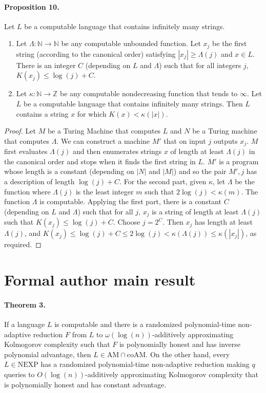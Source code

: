 \documentclass[10pt,a4paper]{article}
\begin{document}
\paragraph{Proposition 10.}
Let $L$ be a computable language that contains infinitely many strings.
\begin{enumerate}
\item Let $\Lambda:\mathbb N\to\mathbb N$ be any computable unbounded function. Let $x_j$ be the first string (according to the canonical order) satisfying $|x_j|\geq\Lambda(j)$ and $x\in L$. There is an integer $C$ (depending on $L$ and $\Lambda$) such that for all integers $j$, $K(x_j)\leq\log(j)+C$.
\item Let $\kappa:\mathbb N\to\mathbb Z$ be any computable nondecreasing function that tends to $\infty$. Let $L$ be a computable language that contains infinitely many strings. Then $L$ contains a string $x$ for which $K(x)<\kappa(|x|)$.
\end{enumerate}
\begin{proof}
Let $M$ be a Turing Machine that computes $L$ and $N$ be a Turing machine that computes $\Lambda$. We can construct a machine $M'$ that on input $j$ outputs $x_j$. $M$ first evaluates $\Lambda(j)$ and then enumerates strings $x$ of length at least $\Lambda(j)$ in the canonical order and stops when it finds the first string in $L$. $M'$ is a program whose length is a constant (depending on $|N|$ and $|M|$) and so the pair $M',j$ has a description of length $\log(j)+C$.
For the second part, given $\kappa$, let $\Lambda$ be the function where $\Lambda(j)$ is the least integer $m$ such that $2\log(j)<\kappa(m)$. The function $\Lambda$ is computable. Applying the first part, there is a constant $C$ (depending on $L$ and $\Lambda$) such that for all $j$, $x_j$ is a string of length at least $\Lambda(j)$ such that $K(x_j)\leq\log(j)+C$. Choose $j=2^C$. Then $x_j$ has length at least $\Lambda(j)$, and $K(x_j)\leq\log(j)+C\leq2\log(j)<\kappa(\Lambda(j))\leq\kappa(|x_j|)$, as required.
\end{proof}

\section*{Formal author main result}
\paragraph{Theorem 3.} If a language $L$ is computable and there is a randomized polynomial-time non-adaptive reduction $F$ from $L$ to $\omega(\log(n))$-additively approximating Kolmogorov complexity such that $F$ is polynomially honest and has inverse polynomial advantage, then $L\in\mathrm{AM}\cap\mathrm{coAM}$. On the other hand, every $L\in\mathrm{NEXP}$ has a randomized polynomial-time non-adaptive reduction making $q$ queries to $O(\log(n))$-additively approximating Kolmogorov complexity that is polynomially honest and has constant advantage.
\end{document}
